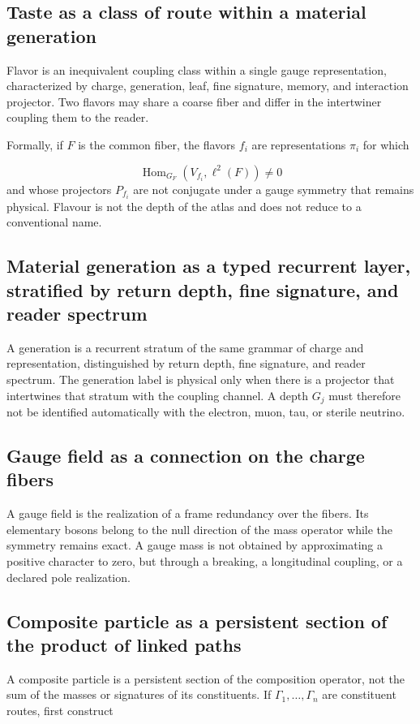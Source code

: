 \subsection{Taste as a class of route within a material generation}
Flavor is an inequivalent coupling class within a single gauge representation, characterized by charge, generation, leaf, fine signature, memory, and interaction projector. Two flavors may share a coarse fiber and differ in the intertwiner coupling them to the reader.

Formally, if \(F\) is the common fiber, the flavors \(f_i\) are representations \(\pi_i\) for which

\[
 \operatorname{Hom}_{G_F}(V_{f_i},\ell^2(F))\ne0
\]
and whose projectors \(P_{f_i}\) are not conjugate under a gauge symmetry that remains physical. Flavour is not the depth of the atlas and does not reduce to a conventional name.

\subsection{Material generation as a typed recurrent layer, stratified by return depth, fine signature, and reader spectrum}
A generation is a recurrent stratum of the same grammar of charge and representation, distinguished by return depth, fine signature, and reader spectrum. The generation label is physical only when there is a projector that intertwines that stratum with the coupling channel. A depth \(G_j\) must therefore not be identified automatically with the electron, muon, tau, or sterile neutrino.

\subsection{Gauge field as a connection on the charge fibers}
A gauge field is the realization of a frame redundancy over the fibers. Its elementary bosons belong to the null direction of the mass operator while the symmetry remains exact. A gauge mass is not obtained by approximating a positive character to zero, but through a breaking, a longitudinal coupling, or a declared pole realization.

\subsection{Composite particle as a persistent section of the product of linked paths}
A composite particle is a persistent section of the composition operator, not the sum of the masses or signatures of its constituents. If \(\Gamma_1,\ldots,\Gamma_n\) are constituent routes, first construct

